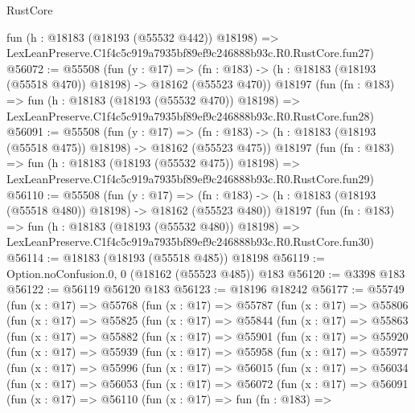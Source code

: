 \begin{lexlean}{RustCore}
\begin{coremodule}
    fun (h : @18183 (@18193 (@55532 @442)) @18198) =>
    LexLeanPreserve.C1f4c5c919a7935bf89ef9c246888b93c.R0.RustCore.fun27)
@56072 := @55508
    (fun (y : @17) =>
    (fn : @183) -> (h : @18183 (@18193 (@55518 @470)) @18198) -> @18162 (@55523 @470))
    @18197
    (fun (fn : @183) =>
    fun (h : @18183 (@18193 (@55532 @470)) @18198) =>
    LexLeanPreserve.C1f4c5c919a7935bf89ef9c246888b93c.R0.RustCore.fun28)
@56091 := @55508
    (fun (y : @17) =>
    (fn : @183) -> (h : @18183 (@18193 (@55518 @475)) @18198) -> @18162 (@55523 @475))
    @18197
    (fun (fn : @183) =>
    fun (h : @18183 (@18193 (@55532 @475)) @18198) =>
    LexLeanPreserve.C1f4c5c919a7935bf89ef9c246888b93c.R0.RustCore.fun29)
@56110 := @55508
    (fun (y : @17) =>
    (fn : @183) -> (h : @18183 (@18193 (@55518 @480)) @18198) -> @18162 (@55523 @480))
    @18197
    (fun (fn : @183) =>
    fun (h : @18183 (@18193 (@55532 @480)) @18198) =>
    LexLeanPreserve.C1f4c5c919a7935bf89ef9c246888b93c.R0.RustCore.fun30)
@56114 := @18183 (@18193 (@55518 @485)) @18198
@56119 := Option.noConfusion.{0, 0} (@18162 (@55523 @485)) @183
@56120 := @3398 @183
@56122 := @56119 @56120 @183
@56123 := @18196 @18242
@56177 := @55749
    (fun (x : @17) =>
    @55768
      (fun (x : @17) =>
      @55787
        (fun (x : @17) =>
        @55806
          (fun (x : @17) =>
          @55825
            (fun (x : @17) =>
            @55844
              (fun (x : @17) =>
              @55863
                (fun (x : @17) =>
                @55882
                  (fun (x : @17) =>
                  @55901
                    (fun (x : @17) =>
                    @55920
                      (fun (x : @17) =>
                      @55939
                        (fun (x : @17) =>
                        @55958
                          (fun (x : @17) =>
                          @55977
                            (fun (x : @17) =>
                            @55996
                              (fun (x : @17) =>
                              @56015
                                (fun (x : @17) =>
                                @56034
                                  (fun (x : @17) =>
                                  @56053
                                    (fun (x : @17) =>
                                    @56072
                                      (fun (x : @17) =>
                                      @56091
                                        (fun (x : @17) =>
                                        @56110
                                          (fun (x : @17) =>
                                          fun (fn : @183) =>

\end{coremodule}
\end{lexlean}
